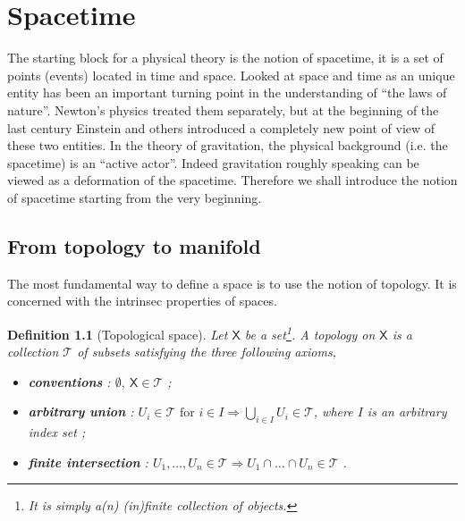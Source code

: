 \documentclass[10pt]{book}
\newcommand{\Tcal}{\mathcal{T}}
\newcommand{\Xsf}{\mathsf{X}}
\theoremstyle{break}
\newtheorem{definition}{Definition}
\begin{document}
\chapter{Spacetime}\label{chap:spacetime}


The starting block for a physical theory is the notion of spacetime, it is a set of points (events) located in time and space. Looked at space and time as an unique entity has been an important turning point in the understanding of ``the laws of nature''. Newton's physics treated them separately, but at the beginning of the last century Einstein and others introduced a completely new point of view of these two entities. In the theory of gravitation, the physical background (i.e. the spacetime) is an ``active actor''. Indeed gravitation roughly speaking can be viewed as a deformation of the spacetime. Therefore we shall introduce the notion of spacetime starting from the very beginning.


\section{From topology to manifold}

The most fundamental way to define a space is to use the notion of topology. It is concerned with the intrinsec properties of spaces.

\begin{definition}[Topological space] 
Let $\Xsf$ be a set\footnote{It is simply a(n) (in)finite collection of objects.}. A topology on $\Xsf$ is a collection $\Tcal$ of subsets satisfying the three following axioms,%
%
\begin{itemize}
\item \textbf{conventions} : $\emptyset , \ \Xsf \in \Tcal$ ;
\item \textbf{arbitrary union} : $U_i \in \Tcal \mbox{ for } i \in I \Longrightarrow \bigcup_{i\in I} U_i \in \Tcal$, where $I$ is an arbitrary index set ;
\item \textbf{finite intersection} : $U_1 , \dots , U_n \in \Tcal \Longrightarrow U_1 \cap \dots \cap U_n \in \Tcal$ .
\end{itemize}
%
\end{definition}
\end{document}
